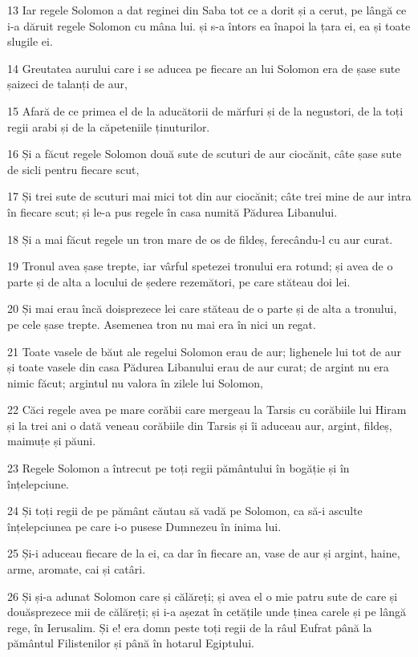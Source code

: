 \par 13 Iar regele Solomon a dat reginei din Saba tot ce a dorit și a cerut, pe lângă ce i-a dăruit regele Solomon cu mâna lui. și s-a întors ea înapoi la țara ei, ea și toate slugile ei.
\par 14 Greutatea aurului care i se aducea pe fiecare an lui Solomon era de șase sute șaizeci de talanți de aur,
\par 15 Afară de ce primea el de la aducătorii de mărfuri și de la negustori, de la toți regii arabi și de la căpeteniile ținuturilor.
\par 16 Și a făcut regele Solomon două sute de scuturi de aur ciocănit, câte șase sute de sicli pentru fiecare scut,
\par 17 Și trei sute de scuturi mai mici tot din aur ciocănit; câte trei mine de aur intra în fiecare scut; și le-a pus regele în casa numită Pădurea Libanului.
\par 18 Și a mai făcut regele un tron mare de os de fildeș, ferecându-l cu aur curat.
\par 19 Tronul avea șase trepte, iar vârful spetezei tronului era rotund; și avea de o parte și de alta a locului de ședere rezemători, pe care stăteau doi lei.
\par 20 Și mai erau încă doisprezece lei care stăteau de o parte și de alta a tronului, pe cele șase trepte. Asemenea tron nu mai era în nici un regat.
\par 21 Toate vasele de băut ale regelui Solomon erau de aur; lighenele lui tot de aur și toate vasele din casa Pădurea Libanului erau de aur curat; de argint nu era nimic făcut; argintul nu valora în zilele lui Solomon,
\par 22 Căci regele avea pe mare corăbii care mergeau la Tarsis cu corăbiile lui Hiram și la trei ani o dată veneau corăbiile din Tarsis și îi aduceau aur, argint, fildeș, maimuțe și păuni.
\par 23 Regele Solomon a întrecut pe toți regii pământului în bogăție și în înțelepciune.
\par 24 Și toți regii de pe pământ căutau să vadă pe Solomon, ca să-i asculte înțelepciunea pe care i-o pusese Dumnezeu în inima lui.
\par 25 Și-i aduceau fiecare de la ei, ca dar în fiecare an, vase de aur și argint, haine, arme, aromate, cai și catâri.
\par 26 Și și-a adunat Solomon care și călăreți; și avea el o mie patru sute de care și douăsprezece mii de călăreți; și i-a așezat în cetățile unde ținea carele și pe lângă rege, în Ierusalim. Și e! era domn peste toți regii de la râul Eufrat până la pământul Filistenilor și până în hotarul Egiptului.
